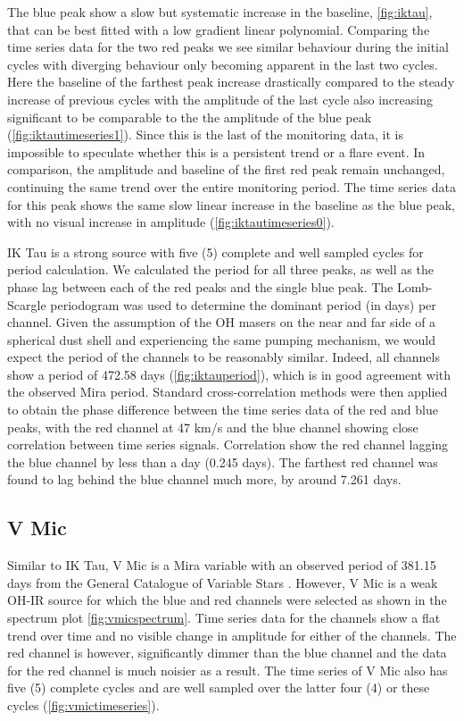 The blue peak show a slow but systematic increase in the baseline, \cref{fig:iktau}, that can be best fitted with a low gradient linear polynomial.
Comparing the time series data for the two red peaks we see similar behaviour during the initial cycles with diverging behaviour only becoming apparent in the last two cycles.
Here the baseline of the farthest peak increase drastically compared to the steady increase of previous cycles with the amplitude of the last cycle also increasing significant to be comparable to the the amplitude of the blue peak (\cref{fig:iktautimeseries1}).
Since this is the last of the monitoring data, it is impossible to speculate whether this is a persistent trend or a flare event.
In comparison, the amplitude and baseline of the first red peak remain unchanged, continuing the same trend over the entire monitoring period.
The time series data for this peak shows the same slow linear increase in the baseline as the blue peak, with no visual increase in amplitude (\cref{fig:iktautimeseries0}).

IK Tau is a strong source with five (5) complete and well sampled cycles for period calculation.
We calculated the period for all three peaks, as well as the phase lag between each of the red peaks and the single blue peak.
The Lomb-Scargle periodogram was used to determine the dominant period (in days) per channel.
Given the assumption of the OH masers on the near and far side of a spherical dust shell and experiencing the same pumping mechanism, we would expect the period of the channels to be reasonably similar.
Indeed, all channels show a period of 472.58 days (\cref{fig:iktauperiod}), which is in good agreement with the observed Mira period.
Standard cross-correlation methods were then applied to obtain the phase difference between the time series data of the red and blue peaks, with the 
red channel at 47 km/s and the blue channel showing close correlation between time series signals.
Correlation show the red channel lagging the blue channel by less than a day (0.245 days).
The farthest red channel was found to lag behind the blue channel much more, by around 7.261 days.


\subsection*{V Mic}
Similar to IK Tau, V Mic is a Mira variable with an observed period of 381.15 days from the General Catalogue of Variable Stars
\citep{2017ARep...61...80S}.
However, V Mic is a weak OH-IR source for which the blue and red channels were selected as shown in the spectrum plot \cref{fig:vmicspectrum}.
Time series data for the channels show a flat trend over time and no visible change in amplitude for either of the channels.
The red channel is however, significantly dimmer than the blue channel and the data for the red channel is much noisier as a result.
The time series of V Mic also has five (5) complete cycles and are well sampled over the latter four (4) or these cycles (\cref{fig:vmictimeseries}).

